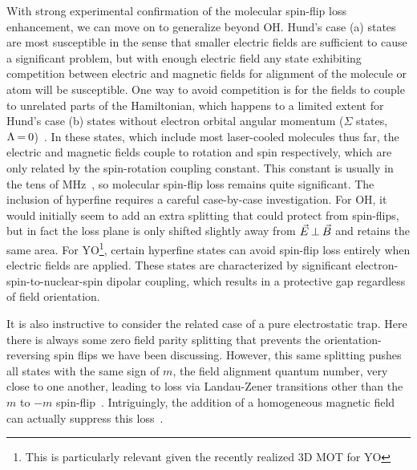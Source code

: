 \documentclass[%
 reprint,
 amsmath,amssymb,
 aps,
pra,
]{revtex4-1}
\newcommand{\epb}{{$\vec{E}\s {\perp}\s\vec{B}$}}
\newcommand{\s}{{\nobreak\hspace{.2em}}}
\begin{document}
With strong experimental confirmation of the molecular spin-flip loss enhancement, we can move on to generalize beyond OH.
Hund's case (a) states are most susceptible in the sense that smaller electric fields are sufficient to cause a significant problem, but with enough electric field any state exhibiting competition between electric and magnetic fields for alignment of the molecule or atom will be susceptible.
One way to avoid competition is for the fields to couple to unrelated parts of the Hamiltonian, which happens to a limited extent for Hund's case (b) states without electron orbital angular momentum ($\Sigma$ states, $\Lambda\s {=}\s 0$)~\cite{Bohn2013}.
In these states, which include most laser-cooled molecules thus far, the electric and magnetic fields couple to rotation and spin respectively, which are only related by the spin-rotation coupling constant.
This constant is usually in the tens of MHz~\cite{Quemener2016}, so molecular spin-flip loss remains quite significant.
The inclusion of hyperfine requires a careful case-by-case investigation. For OH, it would initially seem to add an extra splitting that could protect from spin-flips, but in fact the loss plane is only shifted slightly away from \epb{} and retains the same area.
For YO\s\footnote{This is particularly relevant given the recently realized 3D MOT for YO}, certain hyperfine states can avoid spin-flip loss entirely when electric fields are applied.
These states are characterized by significant electron-spin-to-nuclear-spin dipolar coupling, which results in a protective gap regardless of field orientation.

It is also instructive to consider the related case of a pure electrostatic trap.
Here there is always some zero field parity splitting that prevents the orientation-reversing spin flips we have been discussing.
However, this same splitting pushes all states with the same sign of $m$, the field alignment quantum number, very close to one another, leading to loss via Landau-Zener transitions other than the $m$ to $-m$ spin-flip~\cite{Wall2010}.
Intriguingly, the addition of a homogeneous magnetic field can actually suppress this loss~\cite{Meek2011}.
\end{document}
